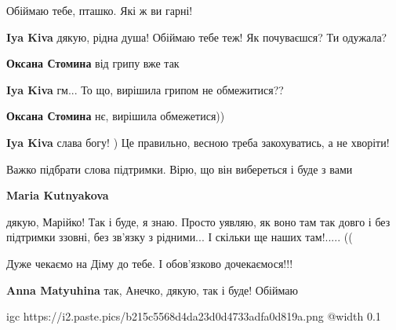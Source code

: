  
 
 
 
 

\qqSecCmt


Обіймаю тебе, пташко. Які ж ви гарні!

\begin{itemize} %
\textbf{Iya Kiva} дякую, рідна душа! Обіймаю тебе теж!
Як почуваєшся? Ти одужала?

\textbf{Оксана Стомина} від грипу вже так 🙂

\textbf{Iya Kiva} гм... То що, вирішила грипом не обмежитися??

\textbf{Оксана Стомина} нє, вирішила обмежетися))

\textbf{Iya Kiva} слава богу! ) Це правильно, весною треба закохуватись, а не хворіти!
\end{itemize} %


Важко підбрати слова підтримки. Вірю, що він вибереться і буде з вами

\begin{itemize} %
\textbf{Maria Kutnyakova} 

дякую, Марійко! Так і буде, я знаю. Просто уявляю, як воно там так довго і без
підтримки ззовні, без зв'язку з рідними... І скільки ще наших там!..... ((

\end{itemize} %


Дуже чекаємо на Діму до тебе. І обов'язково дочекаємося!!!

\begin{itemize} %
\textbf{Anna Matyuhina} так, Анечко, дякую, так і буде! Обіймаю

\ifcmt
  igc https://i2.paste.pics/b215c5568d4da23d0d4733adfa0d819a.png
	@width 0.1
\fi

\end{itemize} %

